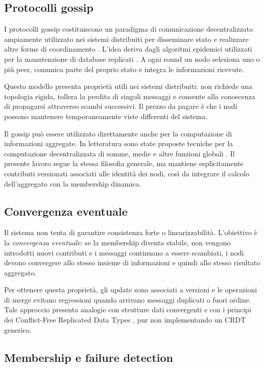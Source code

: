 \documentclass[conference]{IEEEtran}
\begin{document}
\subsection{Protocolli gossip}

I protocolli gossip costituiscono un paradigma di comunicazione decentralizzato ampiamente utilizzato nei sistemi distribuiti per disseminare stato e realizzare altre forme di coordinamento \cite{vansteen2023,kermarrec2007}. L'idea deriva dagli algoritmi epidemici utilizzati per la manutenzione di database replicati \cite{demers1987}. A ogni round un nodo seleziona uno o più peer, comunica parte del proprio stato e integra le informazioni ricevute.

Questo modello presenta proprietà utili nei sistemi distribuiti: non richiede una topologia rigida, tollera la perdita di singoli messaggi e consente alla conoscenza di propagarsi attraverso scambi successivi. Il prezzo da pagare è che i nodi possono mantenere temporaneamente viste differenti del sistema.

Il gossip può essere utilizzato direttamente anche per la computazione di informazioni aggregate. In letteratura sono state proposte tecniche per la computazione decentralizzata di somme, medie e altre funzioni globali \cite{kempe2003,jelasity2005}. Il presente lavoro segue la stessa filosofia generale, ma mantiene esplicitamente contributi versionati associati alle identità dei nodi, così da integrare il calcolo dell'aggregato con la membership dinamica.

\subsection{Convergenza eventuale}

Il sistema non tenta di garantire consistenza forte o linearizzabilità. L'obiettivo è la \emph{convergenza eventuale}: se la membership diventa stabile, non vengono introdotti nuovi contributi e i messaggi continuano a essere scambiati, i nodi devono convergere allo stesso insieme di informazioni e quindi allo stesso risultato aggregato.

Per ottenere questa proprietà, gli update sono associati a versioni e le operazioni di merge evitano regressioni quando arrivano messaggi duplicati o fuori ordine. Tale approccio presenta analogie con strutture dati convergenti e con i principi dei Conflict-Free Replicated Data Types \cite{shapiro2011}, pur non implementando un CRDT generico.

\subsection{Membership e failure detection}
\end{document}
